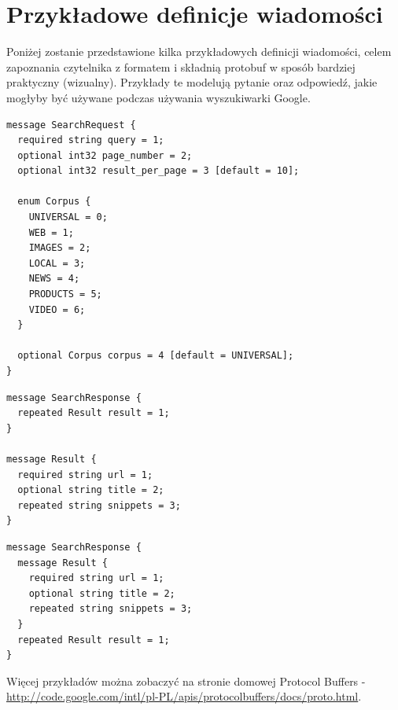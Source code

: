 \newpage
\section{Przykładowe definicje wiadomości}
\label{sec:proto_file_examples}

Poniżej zostanie przedstawione kilka przykładowych definicji wiadomości, celem zapoznania czytelnika z formatem i składnią protobuf w
sposób bardziej praktyczny (wizualny). Przykłady te modelują pytanie oraz odpowiedź, jakie mogłyby być używane podczas używania wyszukiwarki Google.

\begin{lstlisting}[caption={Definicja wiadomości zawierająca enum oraz wartości domyślne}]
message SearchRequest {
  required string query = 1;
  optional int32 page_number = 2;
  optional int32 result_per_page = 3 [default = 10];

  enum Corpus {
    UNIVERSAL = 0;
    WEB = 1;
    IMAGES = 2;
    LOCAL = 3;
    NEWS = 4;
    PRODUCTS = 5;
    VIDEO = 6;
  }

  optional Corpus corpus = 4 [default = UNIVERSAL];
}
\end{lstlisting}

\begin{lstlisting}[caption={Definicja wiadoomści wykorzystującej inną wiadomość}]
message SearchResponse {
  repeated Result result = 1;
}

message Result {
  required string url = 1;
  optional string title = 2;
  repeated string snippets = 3;
}
\end{lstlisting}

\newpage
\begin{lstlisting}[caption={Definicja wiadomości korzystającej z wewnętrznej wiadomości}]
message SearchResponse {
  message Result {
    required string url = 1;
    optional string title = 2;
    repeated string snippets = 3;
  }
  repeated Result result = 1;
}
\end{lstlisting}

Więcej przykładów można zobaczyć na stronie domowej Protocol Buffers - \href{http://code.google.com/intl/pl-PL/apis/protocolbuffers/docs/proto.html}{http://code.google.com/intl/pl-PL/apis/protocolbuffers/docs/proto.html}.
